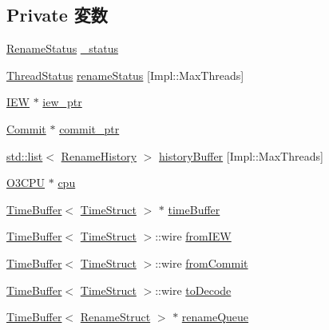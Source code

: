 \subsection*{Private 変数}
\begin{DoxyCompactItemize}
\item 
\hyperlink{classDefaultRename_ac9f77d94a52c9029448b6d7b61d32718}{RenameStatus} \hyperlink{classDefaultRename_a1564313ed7a74659481a1b5ea2bacf88}{\_\-status}
\item 
\hyperlink{classDefaultRename_ae2739961013a00cede621d4d72f2173c}{ThreadStatus} \hyperlink{classDefaultRename_a8c157bf422205d3cdd7e7c75c2592b6f}{renameStatus} \mbox{[}Impl::MaxThreads\mbox{]}
\item 
\hyperlink{classDefaultRename_a2e298f790f528754f0e0ffa0cb8088f6}{IEW} $\ast$ \hyperlink{classDefaultRename_abf7286da8e826739b29fa67855f4216b}{iew\_\-ptr}
\item 
\hyperlink{classDefaultRename_a05a26def5ee77f19d25b86079d161ebd}{Commit} $\ast$ \hyperlink{classDefaultRename_a51b23beeb9e078c0c11831d0f2e56bfd}{commit\_\-ptr}
\item 
\hyperlink{classstd_1_1list}{std::list}$<$ \hyperlink{structDefaultRename_1_1RenameHistory}{RenameHistory} $>$ \hyperlink{classDefaultRename_adc01dc05e6459841df629cb3353ddde9}{historyBuffer} \mbox{[}Impl::MaxThreads\mbox{]}
\item 
\hyperlink{classDefaultRename_a44622cf06940413482836cb62931ac3f}{O3CPU} $\ast$ \hyperlink{classDefaultRename_a1379cf882a12ac6fc9eba5da7c84b18b}{cpu}
\item 
\hyperlink{classTimeBuffer}{TimeBuffer}$<$ \hyperlink{structTimeStruct}{TimeStruct} $>$ $\ast$ \hyperlink{classDefaultRename_a83f9ee976e732665aeb08dbc19acfd45}{timeBuffer}
\item 
\hyperlink{classTimeBuffer}{TimeBuffer}$<$ \hyperlink{structTimeStruct}{TimeStruct} $>$::wire \hyperlink{classDefaultRename_a6c9093e88770a58dc8853f49a09bbac8}{fromIEW}
\item 
\hyperlink{classTimeBuffer}{TimeBuffer}$<$ \hyperlink{structTimeStruct}{TimeStruct} $>$::wire \hyperlink{classDefaultRename_a0055a92bd94eda21c2641d46ff013dac}{fromCommit}
\item 
\hyperlink{classTimeBuffer}{TimeBuffer}$<$ \hyperlink{structTimeStruct}{TimeStruct} $>$::wire \hyperlink{classDefaultRename_aeb2f0e9b4602def9a8a57f7e3e12cf27}{toDecode}
\item 
\hyperlink{classTimeBuffer}{TimeBuffer}$<$ \hyperlink{classDefaultRename_a0c2a89ad2edad9ad605d0461f9b132a5}{RenameStruct} $>$ $\ast$ \hyperlink{classDefaultRename_ae9b536282159ba75153a223be77515ba}{renameQueue}

\end{DoxyCompactItemize}
